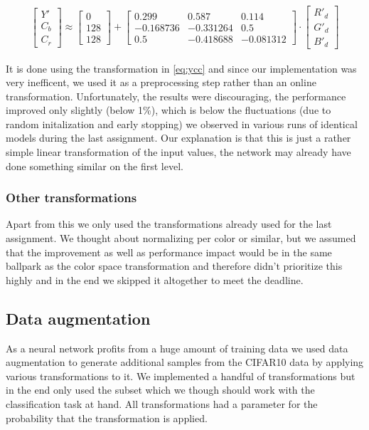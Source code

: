 \begin{align}
\left[\begin{array}{c}Y' \\ C_b \\ C_r\end{array}\right]
\approx
\left[\begin{array}{c}0  \\ 128 \\ 128\end{array}\right]
+
\left[\begin{array}{ccc} 0.299 & 0.587 & 0.114\\ -0.168736 & -0.331264 & 0.5  \\ 0.5 & -0.418688 & -0.081312\end{array}\right]
\cdot
\left[\begin{array}{c}R'_d \\ G'_d \\ B'_d\end{array}\right]\label{eq:ycc}
\end{align}

It is done using the transformation in \eqref{eq:ycc} and since our implementation was very inefficent, we used it as a preprocessing step rather than an online transformation. 
Unfortunately, the results were discouraging, the performance improved only slightly (below 1\%), which is below the fluctuations (due to random initalization and early stopping) we observed in various runs of identical models during the last assignment. Our explanation is that this is just a rather simple linear transformation of the input values, the network may already have done something similar on the first level. 



\subsubsection{Other transformations}
Apart from this we only used the transformations already used for the last assignment. We thought about normalizing per color or similar, but we assumed that the improvement as well as performance impact would be in the same ballpark as the color space transformation and therefore didn't prioritize this highly and in the end we skipped it altogether to meet the deadline.


\subsection{Data augmentation}
As a neural network profits from a huge amount of training data we used data augmentation to generate additional samples from the CIFAR10 data by applying various transformations to it. We implemented a handful of transformations but in the end only used the subset which we though should work with the classification task at hand. All transformations had a parameter  for the probability that the transformation is applied. 
